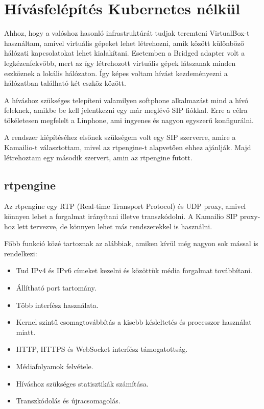 \chapter{Hívásfelépítés Kubernetes nélkül}

Ahhoz, hogy a valóshoz hasonló infrastruktúrát tudjak teremteni VirtualBox-t
használtam, amivel virtuális gépeket lehet létrehozni, amik között különböző 
hálózati kapcsolatokat lehet kialakítani. Esetemben a Bridged adapter volt a 
legkézenfekvőbb, mert az így létrehozott virtuális gépek látszanak minden 
eszköznek a lokális hálózaton. Így képes voltam hívást kezdeményezni a 
hálózatban található két eszköz között. 

A híváshoz szükséges telepíteni valamilyen softphone alkalmazást mind a hívó
feleknek, amikbe be kell jelentkezni egy már meglévő SIP fiókkal. Erre a célra
tökéletesen megfelelt a Linphone, ami ingyenes és nagyon egyszerű konfigurálni. 

A rendszer kiépítéséhez elsőnek szükségem volt egy SIP szerverre, amire a 
Kamailio-t választottam, mivel az rtpengine-t alapvetően ehhez ajánlják. 
Majd létrehoztam egy második szervert, amin az rtpengine futott. 

\section{rtpengine}

Az rtpengine egy RTP (Real-time Transport Protocol) és UDP proxy, amivel könnyen lehet
a forgalmat irányítani illetve transzkódolni. A Kamailio SIP proxy-hoz lett tervezve, de
könnyen lehet más rendszerekkel is használni.

Főbb funkció közé tartoznak az alábbiak, amiken kívül még nagyon sok mással is rendelkezi: 

\begin{itemize}
	\item Tud IPv4 és IPv6 címeket kezelni és közöttük média forgalmat továbbítani. 
	\item Állítható port tartomány. 
	\item Több interfész használata. 
	\item Kernel szintű csomagtovábbítás a kisebb késleltetés és processzor használat miatt.
	\item HTTP, HTTPS és WebSocket interfész támogatottság.
	\item Médiafolyamok felvétele. 
	\item Híváshoz szükséges statisztikák számítása.
	\item Transzkódolás és újracsomagolás.
\end{itemize}

